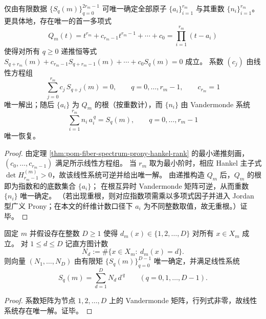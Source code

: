 \begin{theorem}\label{thm:pom-fiber-spectrum-prony-hankel-2r-reconstruction}
仅由有限数据 \(\{S_q(m)\}_{q=0}^{2r_m-1}\) 可唯一确定全部原子 \(\{a_i\}_{i=1}^{r_m}\) 与其重数 \(\{n_i\}_{i=1}^{r_m}\)。
更具体地，存在唯一的首一多项式
\[
Q_m(t)=t^{r_m}+c_{r_m-1}t^{r_m-1}+\cdots+c_0=\prod_{i=1}^{r_m}(t-a_i)
\]
使得对所有 \(q\ge 0\) 递推恒等式
\(
S_{q+r_m}(m)+c_{r_m-1}S_{q+r_m-1}(m)+\cdots+c_0S_q(m)=0
\)
成立。
系数 \((c_j)\) 由线性方程组
\[
\sum_{j=0}^{r_m} c_j\,S_{q+j}(m)=0,\qquad q=0,\dots,r_m-1,\qquad c_{r_m}=1
\]
唯一解出；随后 \(\{a_i\}\) 为 \(Q_m\) 的根（按重数计），而 \(\{n_i\}\) 由 Vandermonde 系统
\[
\sum_{i=1}^{r_m} n_i\,a_i^{\,q}=S_q(m),\qquad q=0,\dots,r_m-1
\]
唯一恢复。
\end{theorem}
\begin{proof}
由定理 \ref{thm:pom-fiber-spectrum-prony-hankel-rank} 的最小递推刻画，
\((c_0,\dots,c_{r_m-1})\) 满足所示线性方程组。
当 \(r_m\) 取为最小阶时，相应 Hankel 主子式 \(\det H^{(m)}_{r_m-1}>0\)，故该线性系统可逆并给出唯一解。
由递推构造 \(Q_m\) 后，\(Q_m\) 的根即为指数和的底数集合 \(\{a_i\}\)；
在根互异时 Vandermonde 矩阵可逆，从而重数 \(\{n_i\}\) 唯一确定。
（若出现重根，则对应指数项需乘以多项式因子并进入 Jordan 型广义 Prony；在本文的纤维计数口径下 \(a_i\) 为不同整数取值，故无重根。）证毕。
\end{proof}

\begin{corollary}\label{cor:pom-degeneracy-histogram-vandermonde-inversion}
固定 \(m\) 并假设存在整数 \(D\ge 1\) 使得 \(d_m(x)\in\{1,2,\dots,D\}\) 对所有 \(x\in X_m\) 成立。
对 \(1\le d\le D\) 记直方图计数
\[
N_d:=\#\{x\in X_m:\ d_m(x)=d\}.
\]
则向量 \((N_1,\dots,N_D)\) 由有限矩 \(\{S_q(m)\}_{q=0}^{D-1}\) 唯一确定，并满足线性系统
\[
S_q(m)=\sum_{d=1}^D N_d\,d^{\,q}\qquad(q=0,1,\dots,D-1).
\]
\end{corollary}
\begin{proof}
系数矩阵为节点 \(1,2,\dots,D\) 上的 Vandermonde 矩阵，行列式非零，故线性系统存在唯一解。证毕。
\end{proof}

